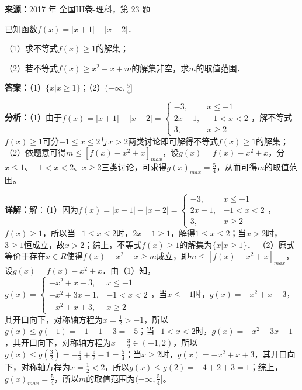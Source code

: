 \begin{question}[points=10]
\textbf{来源：}2017 年 全国III卷-理科，第 23 题\par
[选修4-5：不等式选讲]

已知函数$f(x)=|x+1|-|x-2|$．

（1）求不等式$f(x)\ge 1$的解集；

（2）若不等式$f(x)\ge x^2-x+m$的解集非空，求$m$的取值范围．
\begin{solution}
\textbf{答案：}（1）$\{x|x\ge 1\}$；（2）$(-\infty,\frac{5}{4}]$

\textbf{分析：}（1）由于$f(x)=|x+1|-|x-2|=\begin{cases} -3, & x\le -1 \\ 2x-1, & -1<x<2 \\ 3, & x\ge 2 \end{cases}$，解不等式$f(x)\ge 1$可分$-1\le x\le 2$与$x>2$两类讨论即可解得不等式$f(x)\ge 1$的解集；
（2）依题意可得$m\le [f(x)-x^2+x]_{max}$，设$g(x)=f(x)-x^2+x$，分$x\le 1$、$-1<x<2$、$x\ge 2$三类讨论，可求得$g(x)_{max}=\frac{5}{4}$，从而可得$m$的取值范围。

\textbf{详解：}解：（1）因为$f(x)=|x+1|-|x-2|=\begin{cases} -3, & x\le -1 \\ 2x-1, & -1<x<2 \\ 3, & x\ge 2 \end{cases}$，$f(x)\ge 1$，所以当$-1\le x\le 2$时，$2x-1\ge 1$，解得$1\le x\le 2$；当$x>2$时，$3\ge 1$恒成立，故$x>2$；综上，不等式$f(x)\ge 1$的解集为$\{x|x\ge 1\}$．
（2）原式等价于存在$x\in R$使得$f(x)-x^2+x\ge m$成立，即$m\le [f(x)-x^2+x]_{max}$，设$g(x)=f(x)-x^2+x$．由（1）知，$g(x)=\begin{cases} -x^2+x-3, & x\le -1 \\ -x^2+3x-1, & -1<x<2 \\ -x^2+x+3, & x\ge 2 \end{cases}$，当$x\le -1$时，$g(x)=-x^2+x-3$，其开口向下，对称轴方程为$x=\frac{1}{2}>-1$，所以$g(x)\le g(-1)=-1-1-3=-5$；当$-1<x<2$时，$g(x)=-x^2+3x-1$，其开口向下，对称轴方程为$x=\frac{3}{2}\in(-1,2)$，所以$g(x)\le g(\frac{3}{2})=-\frac{9}{4}+\frac{9}{2}-1=\frac{5}{4}$；当$x\ge 2$时，$g(x)=-x^2+x+3$，其开口向下，对称轴方程为$x=\frac{1}{2}<2$，所以$g(x)\le g(2)=-4+2+3=1$；综上，$g(x)_{max}=\frac{5}{4}$，所以$m$的取值范围为$(-\infty,\frac{5}{4}]$。
\end{solution}
\end{question}

